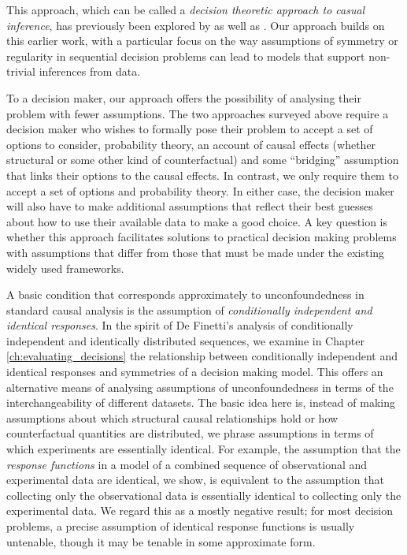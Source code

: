 This approach, which can be called a \emph{decision theoretic approach to casual inference}, has previously been explored by \citet{heckerman_decision-theoretic_1995} as well as \citet{dawid_causal_2000,dawid_influence_2002,dawid_decision-theoretic_2012,dawid_decision-theoretic_2020}. Our approach builds on this earlier work, with a particular focus on the way assumptions of symmetry or regularity in sequential decision problems can lead to models that support non-trivial inferences from data.

To a decision maker, our approach offers the possibility of analysing their problem with fewer assumptions. The two approaches surveyed above require a decision maker who wishes to formally pose their problem to accept a set of options to consider, probability theory, an account of causal effects (whether structural or some other kind of counterfactual) and some ``bridging'' assumption that links their options to the causal effects. In contrast, we only require them to accept a set of options and probability theory. In either case, the decision maker will also have to make additional assumptions that reflect their best guesses about how to use their available data to make a good choice. A key question is whether this approach facilitates solutions to practical decision making problems with assumptions that differ from those that must be made under the existing widely used frameworks.

A basic condition that corresponds approximately to unconfoundedness in standard causal analysis is the assumption of \emph{conditionally independent and identical responses}. In the spirit of De Finetti's analysis of conditionally independent and identically distributed sequences, we examine in Chapter \ref{ch:evaluating_decisions} the relationship between conditionally independent and identical responses and symmetries of a decision making model. This offers an alternative means of analysing assumptions of unconfoundedness in terms of the interchangeability of different datasets. The basic idea here is, instead of making assumptions about which structural causal relationships hold or how counterfactual quantities are distributed, we phrase assumptions in terms of which experiments are essentially identical. For example, the assumption that the \emph{response functions} in a model of a combined sequence of observational and experimental data are identical, we show, is equivalent to the assumption that collecting only the observational data is essentially identical to collecting only the experimental data. We regard this as a mostly negative result; for most decision problems, a precise assumption of identical response functions is usually untenable, though it may be tenable in some approximate form.

